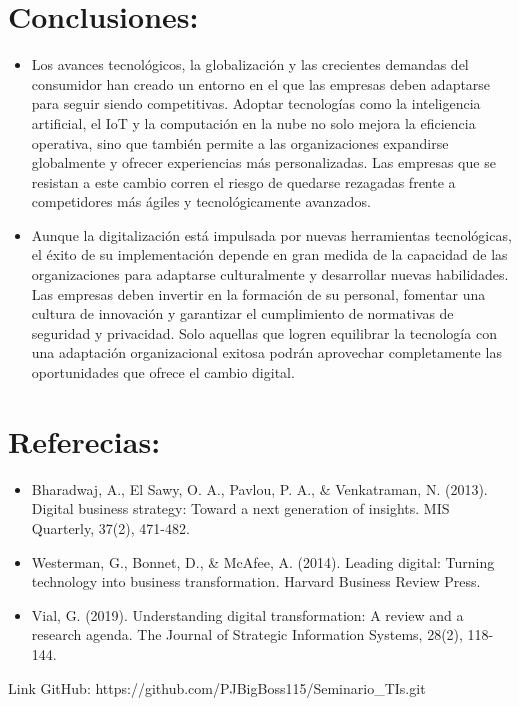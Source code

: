 \documentclass{article}
\begin{document}
\section{Conclusiones:}
\begin{itemize}
    \item Los avances tecnológicos, la globalización y las crecientes demandas del consumidor han creado un entorno en el que las empresas deben adaptarse para seguir siendo competitivas. Adoptar tecnologías como la inteligencia artificial, el IoT y la computación en la nube no solo mejora la eficiencia operativa, sino que también permite a las organizaciones expandirse globalmente y ofrecer experiencias más personalizadas. Las empresas que se resistan a este cambio corren el riesgo de quedarse rezagadas frente a competidores más ágiles y tecnológicamente avanzados.
    \item Aunque la digitalización está impulsada por nuevas herramientas tecnológicas, el éxito de su implementación depende en gran medida de la capacidad de las organizaciones para adaptarse culturalmente y desarrollar nuevas habilidades. Las empresas deben invertir en la formación de su personal, fomentar una cultura de innovación y garantizar el cumplimiento de normativas de seguridad y privacidad. Solo aquellas que logren equilibrar la tecnología con una adaptación organizacional exitosa podrán aprovechar completamente las oportunidades que ofrece el cambio digital.
\end{itemize}

\section{Referecias:}
\begin{itemize}
    \item Bharadwaj, A., El Sawy, O. A., Pavlou, P. A., & Venkatraman, N. (2013). Digital business strategy: Toward a next generation of insights. MIS Quarterly, 37(2), 471-482.
    \item Westerman, G., Bonnet, D., & McAfee, A. (2014). Leading digital: Turning technology into business transformation. Harvard Business Review Press.
    \item Vial, G. (2019). Understanding digital transformation: A review and a research agenda. The Journal of Strategic Information Systems, 28(2), 118-144.
\end{itemize}

Link GitHub: https://github.com/PJBigBoss115/Seminario_TIs.git
\end{document}
